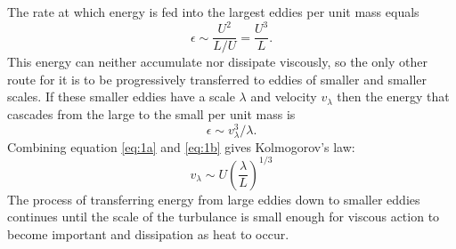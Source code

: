The rate at which energy is fed into the largest eddies per unit mass equals
\begin{equation}
\epsilon \sim \frac{U^2}{L/U} = \frac{U^3}{L}.
\label{eq:1a}
\end{equation} 
This energy can neither accumulate nor dissipate viscously, so the only other route for it is to be progressively transferred to eddies of smaller and smaller scales. If these smaller eddies have a scale $\lambda$ and velocity $v_{\lambda}$ then the energy that cascades from the large to the small per unit mass is
\begin{equation}
\epsilon \sim v_{\lambda}^3/\lambda .
\label{eq:1b}
\end{equation}
Combining equation \ref{eq:1a} and \ref{eq:1b} gives Kolmogorov's law:
\begin{equation}
v_{\lambda} \sim U\left(\frac{\lambda}{L}\right)^{1/3}
\end{equation}
The process of transferring energy from large eddies down to smaller eddies continues until the scale of the turbulance is small enough for viscous action to become important and dissipation as heat to occur. 


